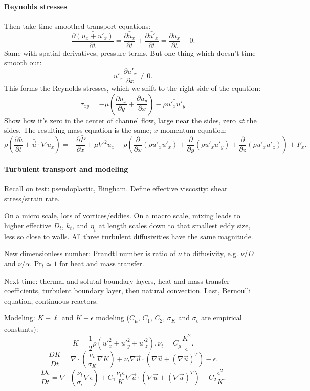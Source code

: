 \documentclass{report}
\begin{document}
\paragraph{Reynolds stresses}

Then take time-smoothed transport equations:
$$\bar{\frac{\partial(\bar{u_x}+u'_x)}{\partial t}} =
\bar{\frac{\partial\bar{u_x}}{\partial t}} +
\bar{\frac{\partial u'_x}{\partial t}} = \frac{\partial\bar{u_x}}{\partial t} +
0.$$
Same with spatial derivatives, pressure terms.  But one thing which doesn't
time-smooth out:
$$u'_x\frac{\partial u'_x}{\partial x}\neq 0.$$
This forms the Reynolds stresses, which we shift to the right side of the
equation:
$$\tau_{xy}=-\mu\left(\frac{\partial u_x}{\partial y} + \frac{\partial u_y}
  {\partial x}\right) - \bar{\rho u'_xu'_y}$$
Show how it's zero in the center of channel flow, large near the sides, zero
{\em at} the sides.  The resulting mass equation is the same; $x$-momentum
equation:
$$\rho\left(\frac{\partial\bar{u}}{\partial t} +
  \bar{\vec{u}}\cdot\nabla\bar{u}_x\right) =
-\frac{\partial\bar{P}}{\partial x} + \mu\nabla^2\bar{u}_x -
\rho\left(\frac{\partial}{\partial x}(\rho u'_xu'_x) +
  \frac{\partial}{\partial y}(\rho u'_xu'_y) +
  \frac{\partial}{\partial z}(\rho u'_xu'_z)\right) + F_x.$$

\paragraph{Turbulent transport and modeling}

Recall on test: pseudoplastic, Bingham.  Define effective viscosity: shear
stress/strain rate.

On a micro scale, lots of vortices/eddies.  On a macro scale, mixing leads to
higher effective $D_t$, $k_t$, and $\eta_t$ at length scales down to that
smallest eddy size, less so close to walls.  All three turbulent diffusivities
have the same magnitude.

New dimensionless number: Prandtl number is ratio of $\nu$ to
diffusivity, e.g. $\nu/D$ and $\nu/\alpha$.  Pr$_t\simeq1$ for heat and mass
transfer.

Next time: thermal and solutal boundary layers, heat and mass transfer
coefficients, turbulent boundary layer, then natural convection.  Last,
Bernoulli equation, continuous reactors.

Modeling: $K-\ell$ and $K-\epsilon$ modeling ($C_\mu$, $C_1$, $C_2$, $\sigma_K$
and $\sigma_\epsilon$ are empirical constants):
$$K=\frac{1}{2}\rho(u'^2_x+u'^2_y+u'^2_z), \nu_t=C_\mu\frac{K^2}{\epsilon}.$$
$$\frac{DK}{Dt} = \nabla\cdot\left(\frac{\nu_t}{\sigma_K}\nabla K\right) +
\nu_t\nabla\vec{u}\cdot\left(\nabla\vec{u}+(\nabla\vec{u})^T\right) -
\epsilon.$$
$$\frac{D\epsilon}{Dt} = 
\nabla\cdot\left(\frac{\nu_t}{\sigma_\epsilon}\nabla\epsilon\right)
+ C_1\frac{\nu_t\epsilon}{K}\nabla\vec{u}\cdot(\nabla\vec{u}+(\nabla\vec{u})^T)
- C_2\frac{\epsilon^2}{K}.$$
\end{document}
